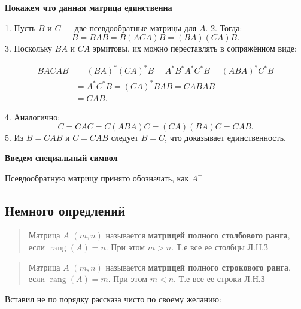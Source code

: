 \documentclass{article}
\begin{document}
    \quad

    \textbf{Покажем что данная матрица единственна}

    \quad

    1. Пусть \(B\) и \(C\) — две псевдообратные матрицы для \(A\).
    2. Тогда:
       \[
       B = BAB = B(AC A)B = (BA)(CA)B.
       \]
    3. Поскольку \(BA\) и \(CA\) эрмитовы, их можно переставлять в сопряжённом виде:

        \begin{align*}
        BACAB &= (BA)^* (CA)^* B
              = A^* B^* A^* C^* B
              = (ABA)^* C^* B \\
              &= A^* C^* B
              = (CA)^* BAB
              = CABAB \\
              &= CAB.
        \end{align*}

    4. Аналогично:
       \[
       C = CAC = C(AB A)C = (CA)(BA)C = C A B.
       \]
    5. Из \(B = CAB\) и \(C = CAB\) следует \(B = C\), что доказывает единственность.

    \quad

    \textbf{Введем специальный символ}

    \quad

    Псевдообратную матрицу принято обозначать, как $A^{+}$

    \quad

    \subsection{Немного опредлений}

    \begin{quote}
        Матрица $A$ $(m, n)$ называется \textbf{матрицей полного столбового ранга}, если $\operatorname{rang}(A) = n$.
        При этом $m > n$.
        Т.е все ее столбцы Л.Н.З
    \end{quote}

    \quad

    \begin{quote}
        Матрица $A$ $(m, n)$ называется \textbf{матрицей полного строкового ранга}, если $\operatorname{rang}(A) = m$.
        При этом $m < n$.
        Т.е все ее строки Л.Н.З
    \end{quote}

    \quad

    Вставил не по порядку рассказа чисто по своему желанию:

    \quad
\end{document}
